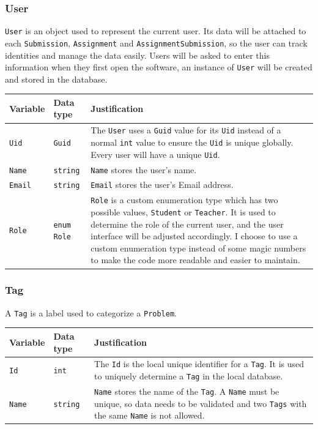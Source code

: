\documentclass[a4paper]{report}
\newcommand{\code}{\texttt}
\begin{document}
\subsubsection{User}

\code{User} is an object used to represent the current user. Its data will be attached to each \code{Submission}, \code{Assignment} and \code{AssignmentSubmission}, so the user can track identities and manage the data easily. Users will be asked to enter this information when they first open the software, an instance of \code{User} will be created and stored in the database.

\begin{tabulary}{\textwidth}{|l|l|L|}
    \hline
    Variable & Data type & Justification \\
    \hline
    \code{Uid} & \code{Guid} & The \code{User} uses a \code{Guid} value for its \code{Uid} instead of a normal \code{int} value to ensure the \code{Uid} is unique globally. Every user will have a unique \code{Uid}. \\
    \hline
    \code{Name} & \code{string} & \code{Name} stores the user's name. \\
    \hline
    \code{Email} & \code{string} & \code{Email} stores the user's Email address. \\
    \hline
    \code{Role} & \code{enum Role} & \code{Role} is a custom enumeration type which has two possible values, \code{Student} or \code{Teacher}. It is used to determine the role of the current user, and the user interface will be adjusted accordingly. I choose to use a custom enumeration type instead of some magic numbers to make the code more readable and easier to maintain. \\
    \hline
\end{tabulary}

\subsubsection{Tag}

A \code{Tag} is a label used to categorize a \code{Problem}.

\begin{tabulary}{\textwidth}{|l|l|L|}
    \hline
    Variable & Data type & Justification \\
    \hline
    \code{Id} & \code{int} & The \code{Id} is the local unique identifier for a \code{Tag}. It is used to uniquely determine a \code{Tag} in the local database. \\
    \hline
    \code{Name} & \code{string} & \code{Name} stores the name of the \code{Tag}. A \code{Name} must be unique, so data needs to be validated and two \code{Tags} with the same \code{Name} is not allowed. \\
    \hline
\end{tabulary}
\end{document}

